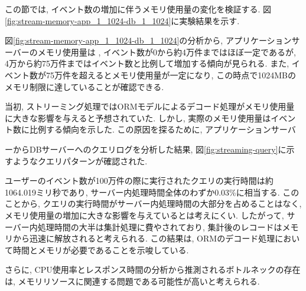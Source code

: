 \documentclass[../../../../../main]{subfiles}
\begin{document}
    \label{subsubsec:result-streaming-only-limit-memory}

    この節では, イベント数の増加に伴うメモリ使用量の変化を検証する. 図\ref{fig:stream-memory-app_1_1024-db_1_1024}に実験結果を示す.

    

    図\ref{fig:stream-memory-app_1_1024-db_1_1024}の分析から, アプリケーションサーバーのメモリ使用量は , イベント数が0から約4万件まではほぼ一定であるが, 4万から約75万件まではイベント数と比例して増加する傾向が見られる. また, イベント数が75万件を超えるとメモリ使用量が一定になり, この時点で1024MBのメモリ制限に達していることが確認できる.

    当初, ストリーミング処理ではORMモデルによるデコード処理がメモリ使用量に大きな影響を与えると予想されていた. しかし, 実際のメモリ使用量はイベント数に比例する傾向を示した. この原因を探るために, アプリケーションサーバ

    ーからDBサーバーへのクエリログを分析した結果, 図\ref{fig:streaming-query}に示すようなクエリパターンが確認された.

    

    ユーザーのイベント数が100万件の際に実行されたクエリの実行時間は約1064.019ミリ秒であり, サーバー内処理時間全体のわずか0.03\%に相当する. このことから, クエリの実行時間がサーバー内処理時間の大部分を占めることはなく, メモリ使用量の増加に大きな影響を与えているとは考えにくい. したがって, サーバー内処理時間の大半は集計処理に費やされており, 集計後のレコードはメモリから迅速に解放されると考えられる. この結果は, ORMのデコード処理において時間とメモリが必要であることを示唆している.

    さらに, CPU使用率とレスポンス時間の分析から推測されるボトルネックの存在は, メモリリソースに関連する問題である可能性が高いと考えられる.
\end{document}
